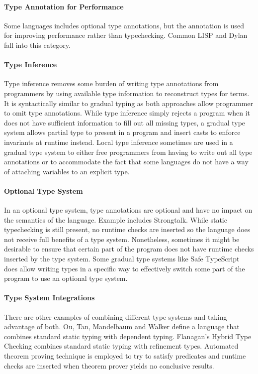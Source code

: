 \paragraph{Type Annotation for Performance}
Some languages includes optional type annotations, but
the annotation is used for improving performance rather than
typechecking.
Common LISP\cite{steele1982overview}
and Dylan\cite{feinberg1996dylan,shalit1996dylan} fall into this category.

\paragraph{Type Inference}
Type inference \cite{damas1982principal,hindley1969principle,milner1978theory}
removes some burden of writing type annotations from programmers
by using available type information to reconstruct types for terms.
It is syntactically similar to gradual typing as both approaches
allow programmer to omit type annotations.
While type inference simply rejects a program when it
does not have sufficient information to fill out all missing types,
a gradual type system allows partial type to present in a program and insert casts
to enforce invariants at runtime instead.
Local type inference \cite{pierce2000local} sometimes are used in a gradual type
system to either free programmers from having to write out all type annotations
or to accommodate the fact that some languages do not have a way of attaching
variables to an explicit type.

\paragraph{Optional Type System}

In an optional type system\cite{bracha2004pluggable},
type annotations are optional and have no impact on the semantics of the language.
Example includes Strongtalk\cite{bracha1993strongtalk}.
While static typechecking is still present, no runtime checks are inserted
so the language does not receive full benefits of a type system.
Nonetheless, sometimes it might be desirable to ensure that certain part of the program
does not have runtime checks inserted by the type system.
Some gradual type systems like Safe TypeScript\cite{rastogi2015safe} does allow writing
types in a specific way to effectively switch some part of the program to use an optional type system.

\paragraph{Type System Integrations}

There are other examples of combining different type systems and taking advantage of both.
Ou, Tan, Mandelbaum and Walker\cite{ou2004dynamic} define a language that combines
standard static typing with dependent typing.
Flanagan's Hybrid Type Checking\cite{flanagan2006hybrid} combines standard static typing
with refinement types. Automated theorem proving technique is employed to try to satisfy predicates
and runtime checks are inserted when theorem prover yields no conclusive results.


